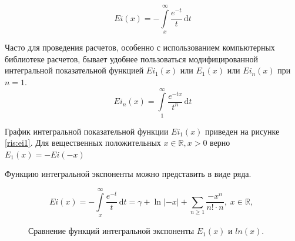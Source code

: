 $$Ei(x)=-\int\limits_{x}^{\infty}\frac{e^{-t}}{t}\,\mathrm dt$$


Часто для проведения расчетов, особенно с использованием компьютерных библиотеке расчетов, бывает удобнее пользоваться модифицированной интегральной показательной функцией $Ei_1(x)$ или $E_1(x)$ или $Ei_n(x)$ при $n=1$.
 $$Ei_n(x) = \int\limits_{1}^{\infty}\frac{e^{-tx}}{t^n}\,\mathrm dt $$

График интегральной показательной функции $Ei_1(x)$ приведен на рисунке \ref{ris:ei1}.
Для вещественных положительных $x\in\mathbb R, x>0$ верно $E_1(x) = - Ei( -x)$

Функцию интегральной экспоненты можно представить в виде ряда. 

$$Ei(x)=-\int\limits_{x}^{\infty}\frac{e^{-t}}{t}\,\mathrm dt=\gamma+\operatorname{ln}|-x|+\sum\limits_{n\ge1}\frac{{-x}^n}{n!\cdot n}, \;  x\in\mathbb R,\;$$

\begin{figure}
	\begin{center}
		\caption{Сравнение функций интегральной экспоненты $E_1(x)$ и $ln(x)$.}
		\label{ris:ei2}
	\end{center}
\end{figure}

